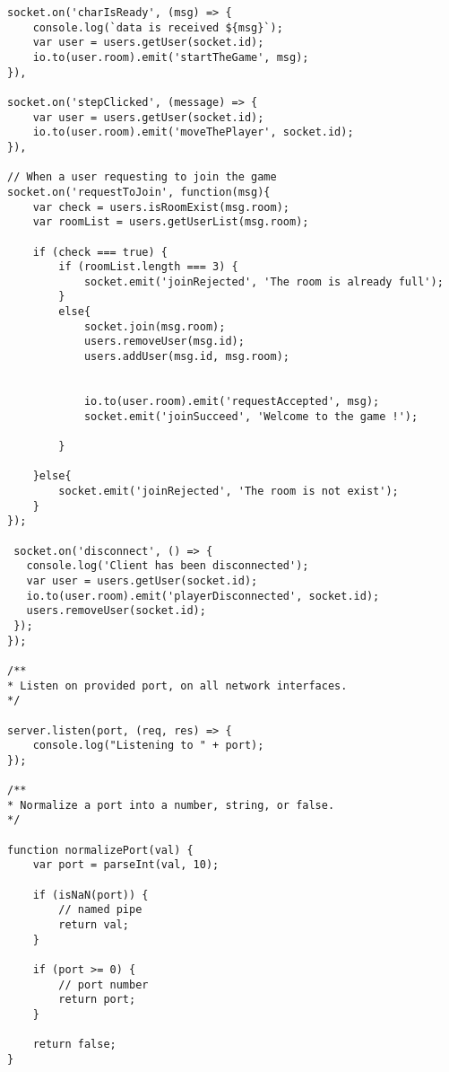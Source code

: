 \begin{lstlisting}[caption={www}]
socket.on('charIsReady', (msg) => {
	console.log(`data is received ${msg}`);
	var user = users.getUser(socket.id);
	io.to(user.room).emit('startTheGame', msg);
}),

socket.on('stepClicked', (message) => {
	var user = users.getUser(socket.id);
	io.to(user.room).emit('moveThePlayer', socket.id);
}),

// When a user requesting to join the game
socket.on('requestToJoin', function(msg){
	var check = users.isRoomExist(msg.room);
	var roomList = users.getUserList(msg.room);

	if (check === true) {
		if (roomList.length === 3) {
			socket.emit('joinRejected', 'The room is already full');
		}
		else{
			socket.join(msg.room);
			users.removeUser(msg.id);
			users.addUser(msg.id, msg.room);


			io.to(user.room).emit('requestAccepted', msg);
			socket.emit('joinSucceed', 'Welcome to the game !');

		}

	}else{
		socket.emit('joinRejected', 'The room is not exist');
	}
});

 socket.on('disconnect', () => {
   console.log('Client has been disconnected');
   var user = users.getUser(socket.id);
   io.to(user.room).emit('playerDisconnected', socket.id);
   users.removeUser(socket.id);
 });
});

/**
* Listen on provided port, on all network interfaces.
*/

server.listen(port, (req, res) => {
	console.log("Listening to " + port);
});

/**
* Normalize a port into a number, string, or false.
*/

function normalizePort(val) {
	var port = parseInt(val, 10);

	if (isNaN(port)) {
		// named pipe
		return val;
	}

	if (port >= 0) {
		// port number
		return port;
	}

	return false;
}



\end{lstlisting}